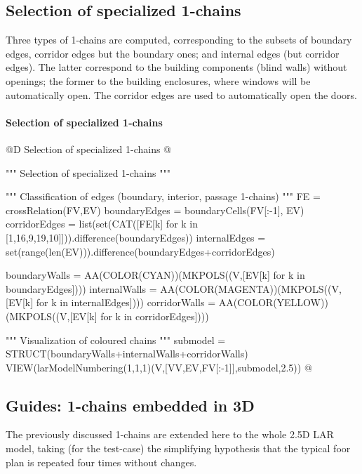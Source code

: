 \documentclass[11pt,oneside]{article}    %
\begin{document}
\subsection{Selection of specialized 1-chains}

Three types of 1-chains are computed, corresponding to the subsets of boundary edges, corridor edges but the boundary ones; and  internal edges (but corridor edges). The latter correspond to the building components (blind walls) without openings; the former to the building enclosures, where windows will be automatically open. The corridor edges are used to automatically open the doors.

\paragraph{Selection of specialized 1-chains}
@D Selection of specialized 1-chains
@{""" Selection of specialized 1-chains """

""" Classification of edges (boundary, interior, passage 1-chains) """
FE = crossRelation(FV,EV)
boundaryEdges = boundaryCells(FV[:-1], EV)
corridorEdges = list(set(CAT([FE[k] for k in [1,16,9,19,10]])).difference(boundaryEdges))
internalEdges = set(range(len(EV))).difference(boundaryEdges+corridorEdges)

boundaryWalls = AA(COLOR(CYAN))(MKPOLS((V,[EV[k] for k in boundaryEdges])))
internalWalls = AA(COLOR(MAGENTA))(MKPOLS((V,[EV[k] for k in internalEdges])))
corridorWalls = AA(COLOR(YELLOW))(MKPOLS((V,[EV[k] for k in corridorEdges])))

""" Visualization of coloured chains """
submodel = STRUCT(boundaryWalls+internalWalls+corridorWalls)
VIEW(larModelNumbering(1,1,1)(V,[VV,EV,FV[:-1]],submodel,2.5))
@}

\subsection{Guides: 1-chains embedded in 3D}

The previously discussed 1-chains are extended here to the whole 2.5D LAR model, taking (for the test-case) the simplifying hypothesis that the typical foor plan is repeated four times without changes.
\end{document}
